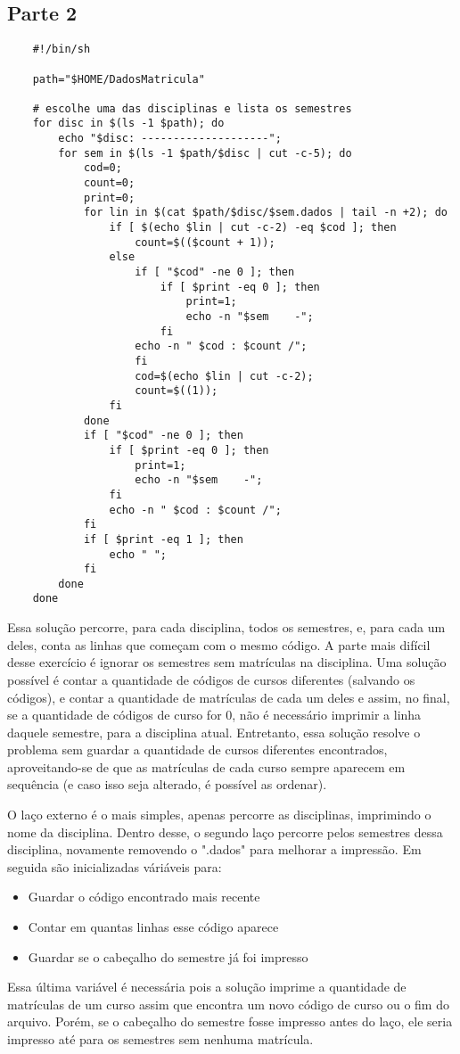 \documentclass[oneside, 11 pt]{article}
\begin{document}
	\newpage
	\subsection{Parte 2}
	
	\begin{lstlisting}
	#!/bin/sh
	
	path="$HOME/DadosMatricula"
	
	# escolhe uma das disciplinas e lista os semestres
	for disc in $(ls -1 $path); do
		echo "$disc: --------------------";
		for sem in $(ls -1 $path/$disc | cut -c-5); do
			cod=0;
			count=0;
			print=0;
			for lin in $(cat $path/$disc/$sem.dados | tail -n +2); do
				if [ $(echo $lin | cut -c-2) -eq $cod ]; then
					count=$(($count + 1));
				else
					if [ "$cod" -ne 0 ]; then
						if [ $print -eq 0 ]; then
							print=1;
							echo -n "$sem    -";
						fi
					echo -n " $cod : $count /"; 
					fi
					cod=$(echo $lin | cut -c-2);
					count=$((1));
				fi  
			done
			if [ "$cod" -ne 0 ]; then
				if [ $print -eq 0 ]; then
					print=1;
					echo -n "$sem    -";
				fi
				echo -n " $cod : $count /"; 
			fi
			if [ $print -eq 1 ]; then
				echo " ";
			fi
		done
	done
	\end{lstlisting}
	
	Essa solução percorre, para cada disciplina, todos os semestres, e, para cada um deles, conta as linhas que começam com o mesmo código. A parte mais difícil desse exercício é ignorar os semestres sem matrículas na disciplina. Uma solução possível é contar a quantidade de códigos de cursos diferentes (salvando os códigos), e contar a quantidade de matrículas de cada um deles e assim, no final, se a quantidade de códigos de curso for 0, não é necessário imprimir a linha daquele semestre, para a disciplina atual. Entretanto, essa solução resolve o problema sem guardar a quantidade de cursos diferentes encontrados, aproveitando-se de que as matrículas de cada curso sempre aparecem em sequência (e caso isso seja alterado, é possível as ordenar).
	
	O laço externo é o mais simples, apenas percorre as disciplinas, imprimindo o nome da disciplina. Dentro desse, o segundo laço percorre pelos semestres dessa disciplina, novamente removendo o ".dados" para melhorar a impressão. Em seguida são inicializadas váriáveis para: 
	\begin{itemize}
		\item Guardar o código encontrado mais recente
		\item Contar em quantas linhas esse código aparece
		\item Guardar se o cabeçalho do semestre já foi impresso
	\end{itemize}
	Essa última variável é necessária pois a solução imprime a quantidade de matrículas de um curso assim que encontra um novo código de curso ou o fim do arquivo. Porém, se o cabeçalho do semestre fosse impresso antes do laço, ele seria impresso até para os semestres sem nenhuma matrícula.
	
\end{document}
